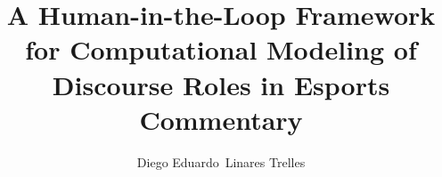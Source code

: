 \documentclass[a4paper,oneside,10pt,ngerman,english]{scrbook}
\begin{document}
\frontmatter


\title{A Human-in-the-Loop Framework for Computational Modeling of Discourse Roles in Esports Commentary}



\author{Diego Eduardo~Linares Trelles }



\end{document}
